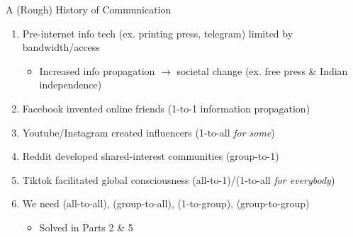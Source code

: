 \documentclass[aspectratio=169]{beamer}
\begin{document}
\begin{frame}{A (Rough) History of Communication}
\vspace{-0.6in}
\begin{enumerate}
    \item Pre-internet info tech (ex. printing press, telegram) limited by bandwidth/access
        \begin{itemize}
            \item Increased info propagation $\rightarrow$ societal change (ex. free press \& Indian independence)
        \end{itemize}
    \item Facebook invented online friends (1-to-1 information propagation)
    \item Youtube/Instagram created influencers (1-to-all \textit{for some})
    \item Reddit developed shared-interest communities (group-to-1)
    \item Tiktok facilitated global consciousness (all-to-1)/(1-to-all \textit{for everybody})
    \item We need (all-to-all), (group-to-all), (1-to-group), (group-to-group)
    \begin{itemize}
        \item Solved in Parts 2 \& 5
    \end{itemize}
\end{enumerate}
\end{frame}
\end{document}
